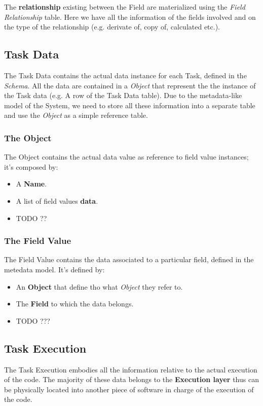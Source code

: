 The \textbf{relationship} existing between the Field are materialized using the
\emph{Field Relationship} table. Here we have all the information of the fields
involved and on the type of the relationship (e.g. derivate of, copy of, calculated
etc.).








\subsection{Task Data}
The Task Data contains the actual data instance for each Task, defined in the
\emph{Schema}. All the data are contained in a \emph{Object} that represent the
the instance of the Task data (e.g. A row of the Task Data table). Due to the
metadata-like model of the System, we need to store all these information into
a separate table and use the \emph{Object} as a simple reference table.

\subsubsection{The Object}
The Object contains the actual data value as reference to field value instances;
it's composed by:
\begin{itemize}
    \item A \textbf{Name}.
    \item A list of field values \textbf{data}.
    \item TODO ??
\end{itemize}


\subsubsection{The Field Value}
The Field Value contains the data associated to a particular field, defined in
the metedata model. It's defined by:
\begin{itemize}
    \item An \textbf{Object} that define tho what \emph{Object} they refer to.
    \item The \textbf{Field} to which the data belongs.
    \item TODO ???
\end{itemize}







\subsection{Task Execution}
The Task Execution embodies all the information relative to the actual execution
of the code. The majority of these data belongs to the \textbf{Execution layer}
thus can be physically located into another piece of software in charge of the
execution of the code.


